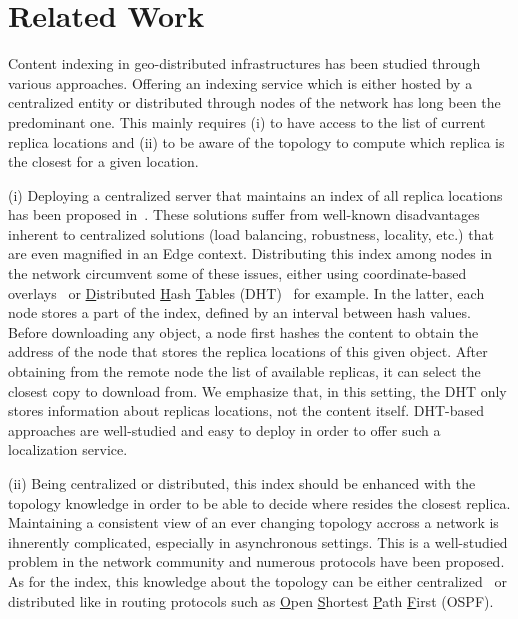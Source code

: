 
\vfill
{}
\newpage

\section{Related Work}
\label{sec:related_work}
Content indexing in geo-distributed infrastructures has been studied through various approaches. 
Offering an indexing service which is either hosted by a centralized entity or distributed through nodes of the network has long been the predominant one. This mainly requires (i) to have access to the list of current replica locations and (ii) to be aware of the topology to compute which replica is the closest for a given location. 

(i) Deploying a centralized server that maintains an index of all replica locations has been proposed in~\cite{snamp, p2p-oracle, fogstore, p2p-alto}. These solutions suffer from well-known disadvantages inherent to centralized solutions (load balancing, robustness, locality, etc.) that are even magnified in an Edge context.
Distributing this index among nodes in the network circumvent some of these issues, either using coordinate-based overlays~\cite{voronet, coin_19} or \underline{D}istributed \underline{H}ash \underline{T}ables (DHT)~\cite{ipfs, mdht, squirrel} for example. In the latter, each node stores a part of the index, defined by an interval between hash values. 
Before downloading any object, a node first
hashes the content to obtain the address of the node that stores the replica locations of this given object. After obtaining from the remote node the list of available replicas, it can select the closest copy to download from. We emphasize that, in this setting, the DHT only stores information about replicas locations, not the content itself. DHT-based approaches are well-studied and easy to deploy in order to offer such a localization service. 


(ii) Being centralized or distributed, this index should be enhanced with the topology knowledge in order to be able to decide where resides the closest replica. Maintaining a consistent view of an ever changing topology accross a network is ihnerently complicated, especially in asynchronous settings. This is a well-studied problem in the network community and numerous protocols have been proposed. As for the index, this knowledge about the topology can be either centralized~\cite{topology-discovery} or distributed like in routing protocols such as \underline{O}pen \underline{S}hortest \underline{P}ath \underline{F}irst (OSPF).


